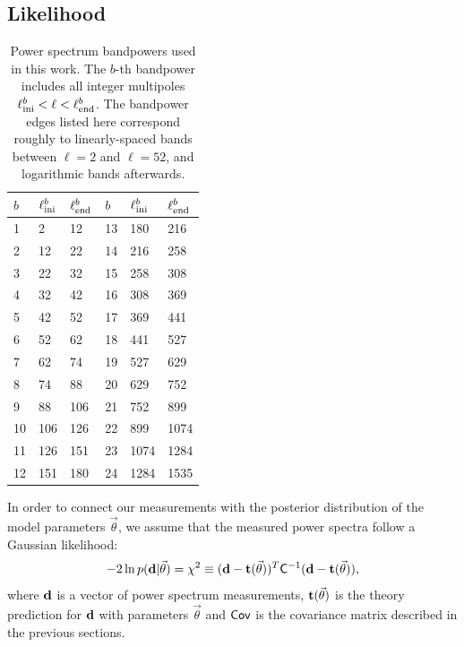 \documentclass[useAMS,usenatbib]{mn2e}
\begin{document}
  \subsection{Likelihood}\label{ssec:methods.like}
    \begin{table}
      \begin{center}
        \begin{tabular}{lll|lll}
          $b$ & $\ell^b_{\rm ini}$ & $\ell^b_{\rm end}$ & $b$ & $\ell^b_{\rm ini}$ & $\ell^b_{\rm end}$ \\[1ex]
          \hline
           1 &   2 &  12 &  13 &  180 &  216\\
           2 &  12 &  22 &  14 &  216 &  258\\
           3 &  22 &  32 &  15 &  258 &  308\\
           4 &  32 &  42 &  16 &  308 &  369\\
           5 &  42 &  52 &  17 &  369 &  441\\
           6 &  52 &  62 &  18 &  441 &  527\\
           7 &  62 &  74 &  19 &  527 &  629\\
           8 &  74 &  88 &  20 &  629 &  752\\
           9 &  88 & 106 &  21 &  752 &  899\\
          10 & 106 & 126 &  22 &  899 & 1074\\
          11 & 126 & 151 &  23 & 1074 & 1284\\
          12 & 151 & 180 &  24 & 1284 & 1535\\
          \hline
        \end{tabular}
        \caption{Power spectrum bandpowers used in this work. The $b$-th bandpower includes all integer multipoles $\ell^b_{\rm ini}<\ell<\ell^b_{\rm end}$. The bandpower edges listed here correspond roughly to linearly-spaced bands between $\ell=2$ and $\ell=52$, and logarithmic bands afterwards.}\label{tab:bpws}
      \end{center}
    \end{table} 
    In order to connect our measurements with the posterior distribution of the model parameters $\vec{\theta}$, we assume that the measured power spectra follow a Gaussian likelihood:
    \begin{equation}
      -2\ln p({\bf d}|\vec{\theta}) = \chi^2\equiv ({\bf d}-{\bf t}(\vec{\theta}))^T {\sf C}^{-1} ({\bf d}-{\bf t}(\vec{\theta})),
    \end{equation}
    where ${\bf d}$ is a vector of power spectrum measurements, ${\bf t}(\vec{\theta})$ is the theory prediction for ${\bf d}$ with parameters $\vec{\theta}$ and ${\sf Cov}$ is the covariance matrix described in the previous sections.
\end{document}
